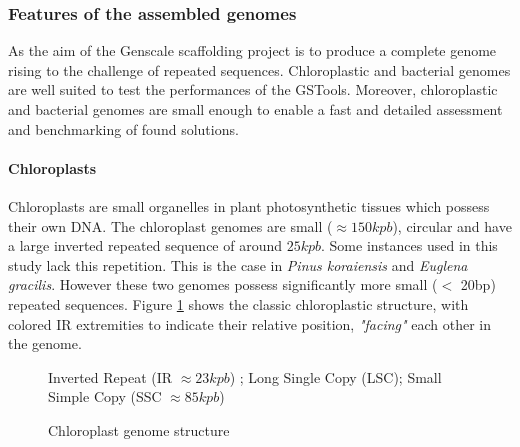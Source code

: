 \documentclass[12pt]{article}
\begin{document}
\subsubsection{Features of the assembled genomes}
\label{sec:genomefeatures}
As the aim of the Genscale scaffolding project is to produce a complete genome rising to the challenge of repeated sequences. Chloroplastic and bacterial genomes are well suited to test the performances of the GSTools. Moreover, chloroplastic and bacterial genomes are small enough to enable a fast and detailed assessment and benchmarking of found solutions.

\paragraph*{Chloroplasts}
Chloroplasts are small organelles in plant photosynthetic tissues which possess their own DNA. The chloroplast genomes are small ($\approx 150kpb$), circular and have a large inverted repeated sequence of around $25kpb$. Some instances used in this study lack this repetition. This is the case in \textit{Pinus koraiensis} and \textit{Euglena gracilis}. However these two genomes possess significantly more small ($<$ 20bp) repeated sequences. Figure \ref{fig:chlostructure} shows the classic chloroplastic structure, with colored IR extremities to indicate their relative position, \textit{"facing"} each other in the genome.
\begin{figure}[h!]
\centering
{}
\caption{Chloroplast genome structure}
{\footnotesize Inverted Repeat (IR $ \approx 23kpb$) ; Long Single Copy (LSC); Small Simple Copy (SSC $\approx 85kpb$)}
\label{fig:chlostructure}
\end{figure}
\end{document}
